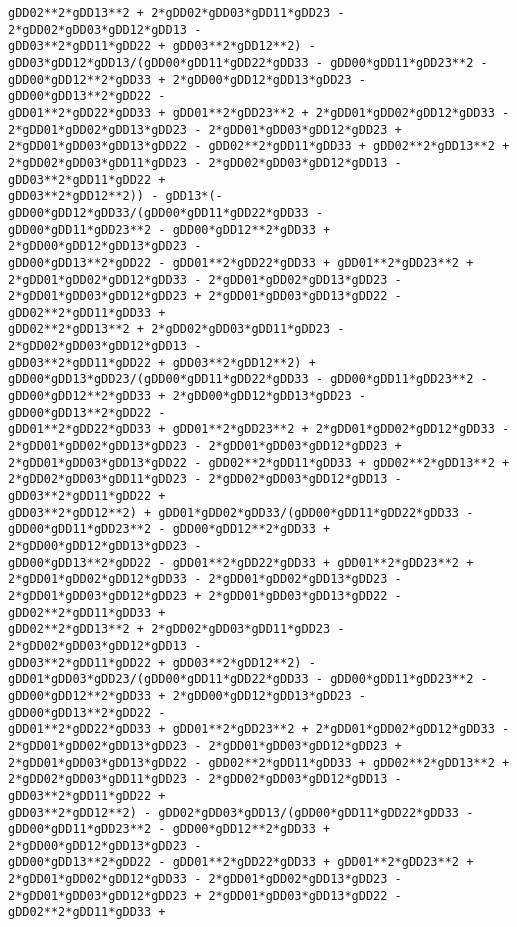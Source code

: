 \documentclass[landscape,letterpaper,10pt,english]{article}
\begin{document}
\begin{Verbatim}[commandchars=\\\{\}]
gDD02**2*gDD13**2 + 2*gDD02*gDD03*gDD11*gDD23 - 2*gDD02*gDD03*gDD12*gDD13 -
gDD03**2*gDD11*gDD22 + gDD03**2*gDD12**2) -
gDD03*gDD12*gDD13/(gDD00*gDD11*gDD22*gDD33 - gDD00*gDD11*gDD23**2 -
gDD00*gDD12**2*gDD33 + 2*gDD00*gDD12*gDD13*gDD23 - gDD00*gDD13**2*gDD22 -
gDD01**2*gDD22*gDD33 + gDD01**2*gDD23**2 + 2*gDD01*gDD02*gDD12*gDD33 -
2*gDD01*gDD02*gDD13*gDD23 - 2*gDD01*gDD03*gDD12*gDD23 +
2*gDD01*gDD03*gDD13*gDD22 - gDD02**2*gDD11*gDD33 + gDD02**2*gDD13**2 +
2*gDD02*gDD03*gDD11*gDD23 - 2*gDD02*gDD03*gDD12*gDD13 - gDD03**2*gDD11*gDD22 +
gDD03**2*gDD12**2)) - gDD13*(-gDD00*gDD12*gDD33/(gDD00*gDD11*gDD22*gDD33 -
gDD00*gDD11*gDD23**2 - gDD00*gDD12**2*gDD33 + 2*gDD00*gDD12*gDD13*gDD23 -
gDD00*gDD13**2*gDD22 - gDD01**2*gDD22*gDD33 + gDD01**2*gDD23**2 +
2*gDD01*gDD02*gDD12*gDD33 - 2*gDD01*gDD02*gDD13*gDD23 -
2*gDD01*gDD03*gDD12*gDD23 + 2*gDD01*gDD03*gDD13*gDD22 - gDD02**2*gDD11*gDD33 +
gDD02**2*gDD13**2 + 2*gDD02*gDD03*gDD11*gDD23 - 2*gDD02*gDD03*gDD12*gDD13 -
gDD03**2*gDD11*gDD22 + gDD03**2*gDD12**2) +
gDD00*gDD13*gDD23/(gDD00*gDD11*gDD22*gDD33 - gDD00*gDD11*gDD23**2 -
gDD00*gDD12**2*gDD33 + 2*gDD00*gDD12*gDD13*gDD23 - gDD00*gDD13**2*gDD22 -
gDD01**2*gDD22*gDD33 + gDD01**2*gDD23**2 + 2*gDD01*gDD02*gDD12*gDD33 -
2*gDD01*gDD02*gDD13*gDD23 - 2*gDD01*gDD03*gDD12*gDD23 +
2*gDD01*gDD03*gDD13*gDD22 - gDD02**2*gDD11*gDD33 + gDD02**2*gDD13**2 +
2*gDD02*gDD03*gDD11*gDD23 - 2*gDD02*gDD03*gDD12*gDD13 - gDD03**2*gDD11*gDD22 +
gDD03**2*gDD12**2) + gDD01*gDD02*gDD33/(gDD00*gDD11*gDD22*gDD33 -
gDD00*gDD11*gDD23**2 - gDD00*gDD12**2*gDD33 + 2*gDD00*gDD12*gDD13*gDD23 -
gDD00*gDD13**2*gDD22 - gDD01**2*gDD22*gDD33 + gDD01**2*gDD23**2 +
2*gDD01*gDD02*gDD12*gDD33 - 2*gDD01*gDD02*gDD13*gDD23 -
2*gDD01*gDD03*gDD12*gDD23 + 2*gDD01*gDD03*gDD13*gDD22 - gDD02**2*gDD11*gDD33 +
gDD02**2*gDD13**2 + 2*gDD02*gDD03*gDD11*gDD23 - 2*gDD02*gDD03*gDD12*gDD13 -
gDD03**2*gDD11*gDD22 + gDD03**2*gDD12**2) -
gDD01*gDD03*gDD23/(gDD00*gDD11*gDD22*gDD33 - gDD00*gDD11*gDD23**2 -
gDD00*gDD12**2*gDD33 + 2*gDD00*gDD12*gDD13*gDD23 - gDD00*gDD13**2*gDD22 -
gDD01**2*gDD22*gDD33 + gDD01**2*gDD23**2 + 2*gDD01*gDD02*gDD12*gDD33 -
2*gDD01*gDD02*gDD13*gDD23 - 2*gDD01*gDD03*gDD12*gDD23 +
2*gDD01*gDD03*gDD13*gDD22 - gDD02**2*gDD11*gDD33 + gDD02**2*gDD13**2 +
2*gDD02*gDD03*gDD11*gDD23 - 2*gDD02*gDD03*gDD12*gDD13 - gDD03**2*gDD11*gDD22 +
gDD03**2*gDD12**2) - gDD02*gDD03*gDD13/(gDD00*gDD11*gDD22*gDD33 -
gDD00*gDD11*gDD23**2 - gDD00*gDD12**2*gDD33 + 2*gDD00*gDD12*gDD13*gDD23 -
gDD00*gDD13**2*gDD22 - gDD01**2*gDD22*gDD33 + gDD01**2*gDD23**2 +
2*gDD01*gDD02*gDD12*gDD33 - 2*gDD01*gDD02*gDD13*gDD23 -
2*gDD01*gDD03*gDD12*gDD23 + 2*gDD01*gDD03*gDD13*gDD22 - gDD02**2*gDD11*gDD33 +

\end{Verbatim}
\end{document}
